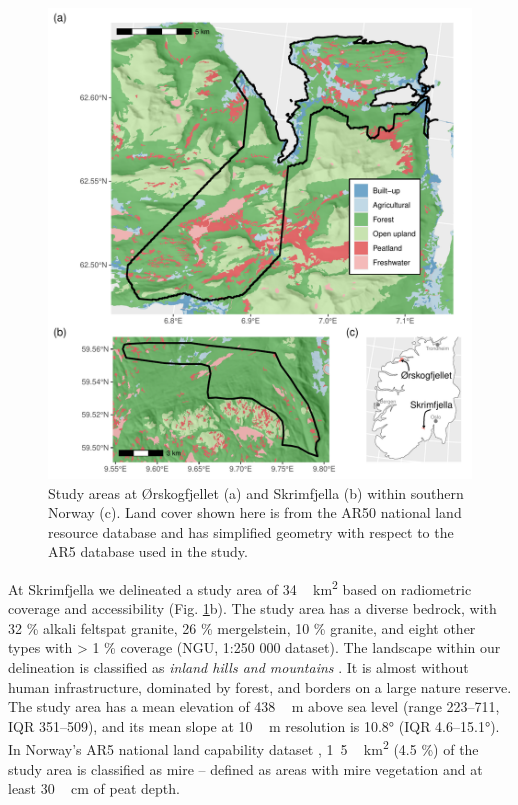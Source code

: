 \documentclass[soil, manuscript]{copernicus}
\begin{document}
\begin{figure}
\includegraphics[height=0.9\textheight]{figures/sites-patchwork} \caption{Study areas at Ørskogfjellet (a) and Skrimfjella (b) within southern Norway (c). Land cover shown here is from the AR50 national land resource database and has simplified geometry with respect to the AR5 database used in the study.}\label{fig:sites}
\end{figure}

At Skrimfjella we delineated a study area of \unit{34\,km^{2}} based on radiometric coverage and accessibility (Fig. \ref{fig:sites}b).
The study area has a diverse bedrock, with 32 \% alkali feltspat granite, 26 \% mergelstein, 10 \% granite, and eight other types with \textgreater{} 1 \% coverage (NGU, 1:250 000 dataset).
The landscape within our delineation is classified as \emph{inland hills and mountains} \citep{simensenDiversityDistributionLandscape2021}.
It is almost without human infrastructure, dominated by forest, and borders on a large nature reserve.
The study area has a mean elevation of \unit{438\,m} above sea level (range 223--711, IQR 351--509), and its mean slope at \unit{10\,m} resolution is 10.8° (IQR 4.6--15.1°).
In Norway's AR5 national land capability dataset \citep{ahlstromAR5Klassifikasjonssystem2019}, \unit{1.5\,km^{2}} (4.5 \%) of the study area is classified as mire -- defined as areas with mire vegetation and at least \unit{30\,cm} of peat depth.
\end{document}
